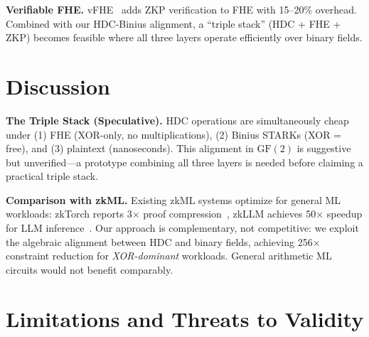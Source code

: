 \documentclass[11pt,twocolumn]{article}
\begin{document}
\textbf{Verifiable FHE.} vFHE~\cite{vfhe2023} adds ZKP verification to FHE with 15--20\% overhead. Combined with our HDC-Binius alignment, a ``triple stack'' (HDC + FHE + ZKP) becomes feasible where all three layers operate efficiently over binary fields.

\section{Discussion}

\textbf{The Triple Stack (Speculative).} HDC operations are simultaneously cheap under (1) FHE (XOR-only, no multiplications), (2) Binius STARKs (XOR = free), and (3) plaintext (nanoseconds). This alignment in $\mathrm{GF}(2)$ is suggestive but unverified---a prototype combining all three layers is needed before claiming a practical triple stack.

\textbf{Comparison with zkML.} Existing zkML systems optimize for general ML workloads: zkTorch reports 3$\times$ proof compression~\cite{zkml2024}, zkLLM achieves 50$\times$ speedup for LLM inference~\cite{zkllm}. Our approach is complementary, not competitive: we exploit the algebraic alignment between HDC and binary fields, achieving 256$\times$ constraint reduction for \emph{XOR-dominant} workloads. General arithmetic ML circuits would not benefit comparably.

\section{Limitations and Threats to Validity}
\end{document}
